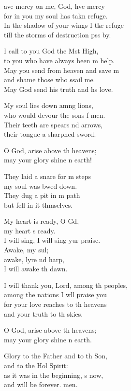 \settowidth{\versewidth}{I will thank you, Lord, among the peoples, *}
\begin{psalmverse}%
  \begin{patverse}
    ave mercy on me, God, hve mercy\Med\\
for in you my soul has takn refuge.\\
In the shadow of your wings I tke refuge\Med\\
till the storms of destruction pss by.

I call to you God the Mst High,\Med\\
to you who have always been m help.\\
May you send from heaven and save m\Flex\\
and shame those who ssail me.\Med\\
May God send his truth and h\pointup{\i}s love.

My soul lies down amng lions,\Med\\
who would devour the sons f men.\\
Their teeth are spears nd arrows,\Med\\
their tongue a sharpned sword.

O God, arise above th heavens;\Med\\
may your glory shine n earth!

They laid a snare for m steps\Med\\
my soul was bwed down.\\
They dug a pit in m path\Med\\
but fell in it thmselves.

My heart is ready, O Gd,\Flex\\
my heart \pointup{\i}s ready.\Med\\
I will sing, I will sing yur praise.\\
Awake, my sul;\Flex\\
awake, lyre nd harp,\Med\\
I will awake th dawn.

I will thank you, Lord, among th peoples,\Med\\
among the nations I w\pointup{\i}ll praise you\\
for your love reaches to th heavens\Med\\
and your truth to th skies.

O God, arise above th heavens;\Med\\
may your glory shine n earth.

Glory to the Father and to th Son,\Med\\
and to the Hol Spirit:\\
as it was in the beginning, \pointup{\i}s now,\Med\\
and will be forever. men. 
  \end{patverse}
\end{psalmverse}
